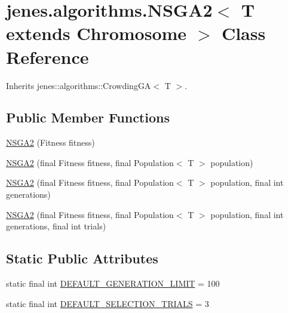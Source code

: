 \hypertarget{classjenes_1_1algorithms_1_1_n_s_g_a2_3_01_t_01extends_01_chromosome_01_4}{
\section{jenes.algorithms.NSGA2$<$ T extends Chromosome $>$ Class Reference}
\label{classjenes_1_1algorithms_1_1_n_s_g_a2_3_01_t_01extends_01_chromosome_01_4}
}
Inherits jenes::algorithms::CrowdingGA$<$ T $>$.

\subsection*{Public Member Functions}
\begin{CompactItemize}
\item 
\hyperlink{classjenes_1_1algorithms_1_1_n_s_g_a2_3_01_t_01extends_01_chromosome_01_4_0e9264bdd3c0f0f73fecdc89038b2898}{NSGA2} (Fitness fitness)
\item 
\hyperlink{classjenes_1_1algorithms_1_1_n_s_g_a2_3_01_t_01extends_01_chromosome_01_4_49f57f66489874c5bf12b3f9c89e6fcc}{NSGA2} (final Fitness fitness, final Population$<$ T $>$ population)
\item 
\hyperlink{classjenes_1_1algorithms_1_1_n_s_g_a2_3_01_t_01extends_01_chromosome_01_4_4da7d36c029be00959ea063643833486}{NSGA2} (final Fitness fitness, final Population$<$ T $>$ population, final int generations)
\item 
\hyperlink{classjenes_1_1algorithms_1_1_n_s_g_a2_3_01_t_01extends_01_chromosome_01_4_c0873ceec23f2908e64650b2e0f2b62a}{NSGA2} (final Fitness fitness, final Population$<$ T $>$ population, final int generations, final int trials)
\end{CompactItemize}
\subsection*{Static Public Attributes}
\begin{CompactItemize}
\item 
static final int \hyperlink{classjenes_1_1algorithms_1_1_n_s_g_a2_3_01_t_01extends_01_chromosome_01_4_63cad03fd3ef9a70933b35dbe043b4ea}{DEFAULT\_\-GENERATION\_\-LIMIT} = 100
\item 
static final int \hyperlink{classjenes_1_1algorithms_1_1_n_s_g_a2_3_01_t_01extends_01_chromosome_01_4_a480c4702a4fbf2bb1ec8c8f9c7dc82b}{DEFAULT\_\-SELECTION\_\-TRIALS} = 3
\end{CompactItemize}
